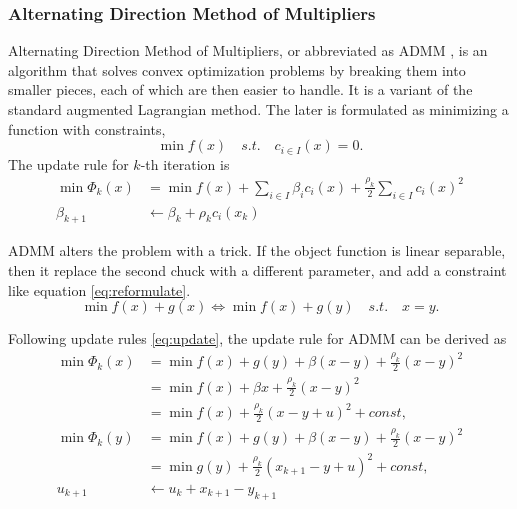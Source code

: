 \documentclass[a4paper,10pt]{article}
\begin{document}
\subsubsection{Alternating Direction Method of Multipliers}\label{admm}
Alternating Direction Method of Multipliers, or abbreviated as ADMM \cite{admm}, is an algorithm that solves convex optimization problems by breaking them into smaller pieces, each of which are then easier to handle. It is a variant of the standard augmented Lagrangian method. The later is formulated as minimizing a function with constraints, \[\min f(x) \quad s.t. \quad c_{i\in I}(x) = 0.\] The update rule for $k$-th iteration is 
	\begin{equation}
		\begin{split}
		\min \Phi_k(x) &= \min f(x) + \sum_{i\in I}\beta_ic_i(x) + \frac{\rho_k}{2}\sum_{i\in I}c_i(x)^2\\
		\beta_{k+1} &\leftarrow \beta_k + \rho_k c_i(x_k)
		\end{split}
		\label{eq:update}
	\end{equation}

ADMM alters the problem with a trick. If the object function is linear separable, then it replace the second chuck with a different parameter, and add a constraint like equation \ref{eq:reformulate}.
\[\min f(x)+g(x) \iff \min f(x)+g(y) \quad s.t. \quad x=y.\]

Following update rules \ref{eq:update}, the update rule for ADMM can be derived as
	\begin{equation}
		\begin{split}
			\min \Phi_k(x) &= \min f(x) + g(y) + \beta(x-y) + \frac{\rho_k}{2}(x-y)^2 \\
				&= \min f(x) + \beta x + \frac{\rho_k}{2}(x-y)^2 \\
				&= \min f(x) + \frac{\rho_k}{2}(x-y + u)^2 + const,\\
			\min \Phi_k(y) &= \min f(x) + g(y) + \beta(x-y) + \frac{\rho_k}{2}(x-y)^2 \\
				&= \min g(y) + \frac{\rho_k}{2}(x_{k+1}-y + u)^2 + const,\\
				u_{k+1} &\leftarrow u_k + x_{k+1} - y_{k+1}
		\end{split}
		\label{eq:admm_org}
	\end{equation}
\end{document}
